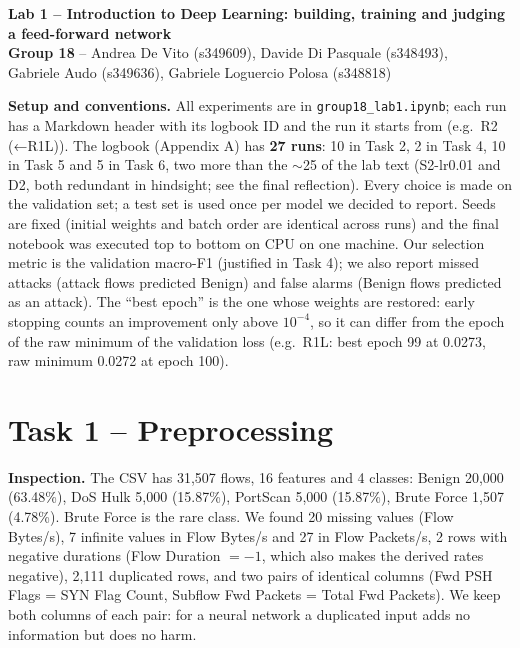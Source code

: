 \documentclass[9pt]{extarticle}
\newcommand{\run}[1]{\textsf{#1}}
\begin{document}
\begin{center}
{\large\textbf{Lab 1 -- Introduction to Deep Learning: building, training and judging a feed-forward network}}\\[3pt]
\textbf{Group 18} -- Andrea De Vito (s349609), Davide Di Pasquale (s348493),\\ Gabriele Audo (s349636), Gabriele Loguercio Polosa (s348818)
\end{center}

\noindent\textbf{Setup and conventions.} All experiments are in \texttt{group18\_lab1.ipynb}; each run has a Markdown header with its logbook ID and the run it starts from (e.g.\ \run{R2 (←R1L)}). The logbook (Appendix A) has \textbf{27 runs}: 10 in Task 2, 2 in Task 4, 10 in Task 5 and 5 in Task 6, two more than the $\sim$25 of the lab text (\run{S2-lr0.01} and \run{D2}, both redundant in hindsight; see the final reflection). Every choice is made on the validation set; a test set is used once per model we decided to report. Seeds are fixed (initial weights and batch order are identical across runs) and the final notebook was executed top to bottom on CPU on one machine. Our selection metric is the validation macro-F1 (justified in Task 4); we also report missed attacks (attack flows predicted Benign) and false alarms (Benign flows predicted as an attack). The ``best epoch'' is the one whose weights are restored: early stopping counts an improvement only above $10^{-4}$, so it can differ from the epoch of the raw minimum of the validation loss (e.g.\ \run{R1L}: best epoch 99 at 0.0273, raw minimum 0.0272 at epoch 100).

\section{Task 1 -- Preprocessing}

\textbf{Inspection.} The CSV has 31,507 flows, 16 features and 4 classes: Benign 20,000 (63.48\%), DoS Hulk 5,000 (15.87\%), PortScan 5,000 (15.87\%), Brute Force 1,507 (4.78\%). Brute Force is the rare class. We found 20 missing values (Flow Bytes/s), 7 infinite values in Flow Bytes/s and 27 in Flow Packets/s, 2 rows with negative durations (Flow Duration $=-1$, which also makes the derived rates negative), 2,111 duplicated rows, and two pairs of identical columns (Fwd PSH Flags = SYN Flag Count, Subflow Fwd Packets = Total Fwd Packets). We keep both columns of each pair: for a neural network a duplicated input adds no information but does no harm.
\end{document}
